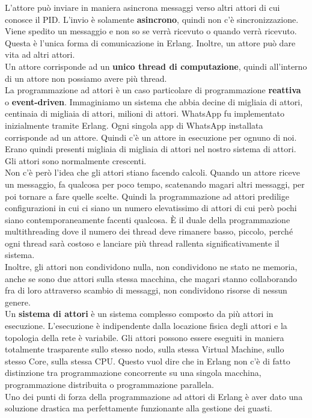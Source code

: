 \documentclass{article}
\begin{document}
L'attore può inviare in maniera asincrona messaggi verso altri attori di cui conosce il PID. L'invio è solamente \textbf{asincrono}, quindi non c'è sincronizzazione. Viene spedito un messaggio e non so se verrà ricevuto o quando verrà ricevuto. Questa è l'unica forma di comunicazione in Erlang. Inoltre, un attore può dare vita ad altri attori.\vspace{14pt}\\
Un attore corrisponde ad un \textbf{unico thread di computazione}, quindi all'interno di un attore non possiamo avere più thread.\\
La programmazione ad attori è un caso particolare di programmazione \textbf{reattiva} o \textbf{event-driven}. Immaginiamo un sistema che abbia decine di migliaia di attori, centinaia di migliaia di attori, milioni di attori. WhatsApp fu implementato inizialmente tramite Erlang. Ogni singola app di WhatsApp installata corrisponde ad un attore. Quindi c'è un attore in esecuzione per ognuno di noi. Erano quindi presenti migliaia di migliaia di attori nel nostro sistema di attori. Gli attori sono normalmente crescenti.\vspace{14pt}\\
Non c'è però l'idea che gli attori stiano facendo calcoli. Quando un attore riceve un messaggio, fa qualcosa per poco tempo, scatenando magari altri messaggi, per poi tornare a fare quelle scelte. Quindi la programmazione ad attori predilige configurazioni in cui ci siano un numero elevatissimo di attori di cui però pochi siano contemporaneamente facenti qualcosa. È il duale della programmazione multithreading dove il numero dei thread deve rimanere basso, piccolo, perché ogni thread sarà costoso e lanciare più thread rallenta significativamente il sistema.\vspace{14pt}\\
Inoltre, gli attori non condividono nulla, non condividono ne stato ne memoria, anche se sono due attori sulla stessa macchina, che magari stanno collaborando fra di loro attraverso scambio di messaggi, non condividono risorse di nessun genere.\vspace{14pt}\\
Un \textbf{sistema di attori} è un sistema complesso composto da più attori in esecuzione. L'esecuzione è indipendente dalla locazione fisica degli attori e la topologia della rete è variabile. Gli attori possono essere eseguiti in maniera totalmente trasparente sullo stesso nodo, sulla stessa Virtual Machine, sullo stesso Core, sulla stessa CPU. Questo vuol dire che in Erlang non c'è di fatto distinzione tra programmazione concorrente su una singola macchina, programmazione distribuita o programmazione parallela.\\
Uno dei punti di forza della programmazione ad attori di Erlang è aver dato una soluzione drastica ma perfettamente funzionante alla gestione dei guasti.
\end{document}
